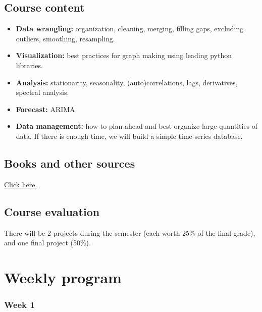 \documentclass[
  letterpaper,
  DIV=11,
  numbers=noendperiod,
  oneside]{scrreprt}
\providecommand{\tightlist}{%
  \setlength{\itemsep}{0pt}\setlength{\parskip}{0pt}}\usepackage{longtable,booktabs,array}
\begin{document}
\hypertarget{course-content}{%
\subsection*{Course content}\label{course-content}}

\begin{itemize}
\tightlist
\item
  \textbf{Data wrangling:} organization, cleaning, merging, filling
  gaps, excluding outliers, smoothing, resampling.
\item
  \textbf{Visualization:} best practices for graph making using leading
  python libraries.
\item
  \textbf{Analysis:} stationarity, seasonality, (auto)correlations,
  lags, derivatives, spectral analysis.
\item
  \textbf{Forecast:} ARIMA
\item
  \textbf{Data management:} how to plan ahead and best organize large
  quantities of data. If there is enough time, we will build a simple
  time-series database.
\end{itemize}

\hypertarget{books-and-other-sources}{%
\subsection*{Books and other sources}\label{books-and-other-sources}}

\href{references.html}{Click here.}

\hypertarget{course-evaluation}{%
\subsection*{Course evaluation}\label{course-evaluation}}

There will be 2 projects during the semester (each worth 25\% of the
final grade), and one final project (50\%).

\hypertarget{weekly-program}{%
\section*{Weekly program}\label{weekly-program}}


\hypertarget{week-1}{%
\subsubsection*{Week 1}\label{week-1}}
\end{document}
